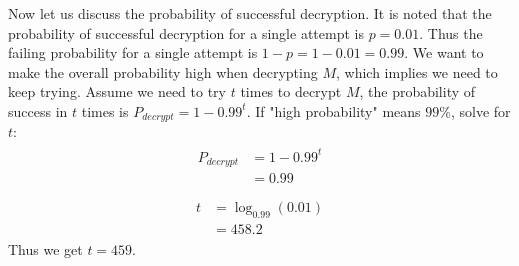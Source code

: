 \documentclass[titlepage, paper=a4, fontsize=11pt]{scrartcl} %
\numberwithin{equation}{section} %
\numberwithin{figure}{section} %
\numberwithin{table}{section} %
\begin{document}
Now let us discuss the probability of successful decryption. It is noted that the probability of successful decryption
for a single attempt is $p = 0.01$. Thus the failing probability for a single attempt is $1-p = 1- 0.01 = 0.99$.
We want to make the overall probability high when decrypting $M$, which implies we need to keep trying.
Assume we need to try $t$ times to decrypt $M$, the probability of success in $t$ times is
$P_{decrypt} = 1-0.99^t$. If "high probability" means $99\%$, solve for $t$:
\begin{align*} 
\begin{split}
P_{decrypt} &= 1 - 0.99^t \\
&= 0.99 \\
\end{split}					
\end{align*}
\begin{align*} 
\begin{split}
t &= \log_{0.99}(0.01) \\
&= 458.2
\end{split}					
\end{align*}
Thus we get $t = 459$.
\\
\end{document}
